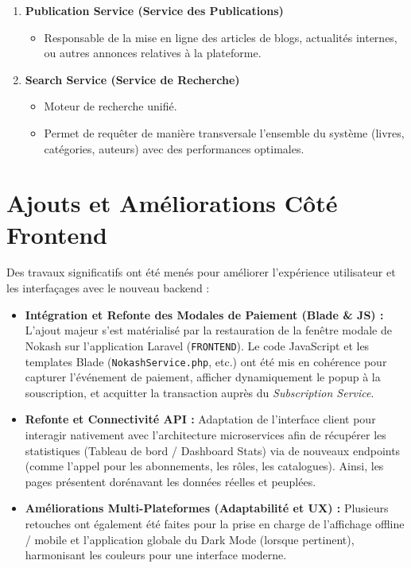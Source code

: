 \documentclass[12pt,a4paper]{article}
\begin{document}
\begin{enumerate}[label=\textbf{\arabic*.}]
    \item \textbf{Publication Service (Service des Publications)}
    \begin{itemize}
        \item Responsable de la mise en ligne des articles de blogs, actualités internes, ou autres annonces relatives à la plateforme.
    \end{itemize}

    \item \textbf{Search Service (Service de Recherche)}
    \begin{itemize}
        \item Moteur de recherche unifié.
        \item Permet de requêter de manière transversale l'ensemble du système (livres, catégories, auteurs) avec des performances optimales.
    \end{itemize}
\end{enumerate}

\section{Ajouts et Améliorations Côté Frontend}
Des travaux significatifs ont été menés pour améliorer l'expérience utilisateur et les interfaçages avec le nouveau backend :

\begin{itemize}
    \item \textbf{Intégration et Refonte des Modales de Paiement (Blade \& JS) :}
    L'ajout majeur s'est matérialisé par la restauration de la fenêtre modale de Nokash sur l'application Laravel (\texttt{FRONTEND}). Le code JavaScript et les templates Blade (\texttt{NokashService.php}, etc.) ont été mis en cohérence pour capturer l'événement de paiement, afficher dynamiquement le popup à la souscription, et acquitter la transaction auprès du \textit{Subscription Service}.
    
    \item \textbf{Refonte et Connectivité API :}
    Adaptation de l'interface client pour interagir nativement avec l'architecture microservices afin de récupérer les statistiques (Tableau de bord / Dashboard Stats) via de nouveaux endpoints (comme l'appel pour les abonnements, les rôles, les catalogues). Ainsi, les pages présentent dorénavant les données réelles et peuplées.
    
    \item \textbf{Améliorations Multi-Plateformes (Adaptabilité et UX) :}
    Plusieurs retouches ont également été faites pour la prise en charge de l'affichage offline / mobile et l'application globale du Dark Mode (lorsque pertinent), harmonisant les couleurs pour une interface moderne.
\end{itemize}
\end{document}
